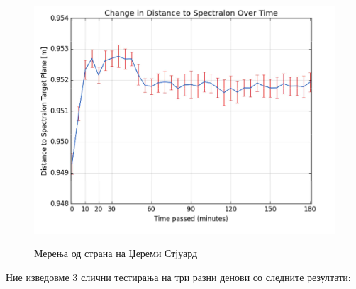 \documentclass[12pt]{article}
\begin{document}
    \begin{figure}[H]
      \centering
      \includegraphics[width = 0.75\linewidth]{./images/heatup.png}
      \label{fig:heatup}
      \caption{Мерења од страна на Џереми Стјуард \cite{heatup}}
    \end{figure}
     Ние изведовме 3 слични тестирања на три разни денови со следните резултати:
\end{document}
